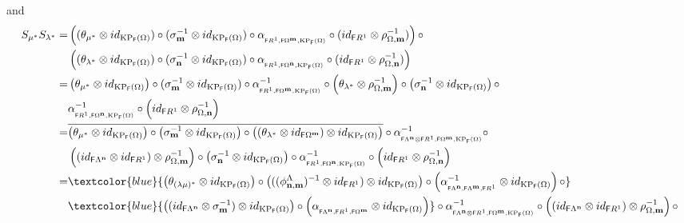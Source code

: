 \documentclass[12pt]{amsart}
\newcommand{\N}{\mathbf{n}}
\newcommand{\M}{\mathbf{m}}
\newcommand{\KP}{\operatorname{KP}}
\theoremstyle{definition}
\theoremstyle{remark}
\begin{document}
and 
{\allowdisplaybreaks
\begin{align*}
    S_{\mu^*}S_{\lambda^*}=& \left((\theta_{\mu^*}\otimes id_{\KP_\mathsf{F}(\Omega)})\circ (\sigma_\M^{-1}\otimes id_{\KP_\mathsf{F}(\Omega)})\circ \alpha_{_{\mathsf{F}R^1,\mathsf{F}\Omega^\M,\KP_\mathsf{F}(\Omega)}}\circ (id_{\mathsf{F}R^1}\otimes \rho_{\Omega,\M}^{-1})\right)\circ\\
    &\left((\theta_{\lambda^*}\otimes id_{\KP_\mathsf{F}(\Omega)})\circ (\sigma_\N^{-1}\otimes id_{\KP_\mathsf{F}(\Omega)})\circ \alpha_{_{\mathsf{F}R^1,\mathsf{F}\Omega^\N,\KP_\mathsf{F}(\Omega)}}\circ (id_{\mathsf{F}R^1}\otimes \rho_{\Omega,\N}^{-1})\right)\\
    =& \left(\theta_{\mu^*}\otimes id_{\KP_\mathsf{F}(\Omega)}\right)\circ (\sigma_\M^{-1}\otimes id_{\KP_\mathsf{F}(\Omega)})\circ \alpha_{_{\mathsf{F}R^1,\mathsf{F}\Omega^\M,\KP_\mathsf{F}(\Omega)}}^{-1}\circ \left(\theta_{\lambda^*}\otimes \rho_{\Omega,\M}^{-1}\right)\circ \left(\sigma_\N^{-1}\otimes id_{\KP_\mathsf{F}(\Omega)}\right)\circ\\
    &\alpha_{_{\mathsf{F}R^1,\mathsf{F}\Omega^\N,\KP_\mathsf{F}(\Omega)}}^{-1}\circ \left(id_{\mathsf{F}R^1}\otimes \rho_{\Omega,\N}^{-1}\right)\\
    =& \overline{\left(\theta_{\mu^*}\otimes id_{\KP_\mathsf{F}(\Omega)}\right)\circ \left(\sigma_\M^{-1}\otimes id_{\KP_\mathsf{F}(\Omega)}\right)\circ \left((\theta_{\lambda^*}\otimes id_{\mathsf{F}\Omega^\M})\otimes id_{\KP_\mathsf{F}(\Omega)}\right)}\circ \alpha_{_{\mathsf{F}\Lambda^\N\otimes \mathsf{F}R^1,\mathsf{F}\Omega^\M,\KP_\mathsf{F}(\Omega)}}^{-1}\circ\\
    &\left((id_{\mathsf{F}\Lambda^\N}\otimes id_{\mathsf{F}R^1})\otimes \rho_{\Omega,\M}^{-1}\right)\circ \left(\sigma_\N^{-1}\otimes id_{\KP_\mathsf{F}(\Omega)}\right)\circ \alpha_{_{\mathsf{F}R^1,\mathsf{F}\Omega^\N,\KP_\mathsf{F}(\Omega)}}^{-1}\circ \left(id_{\mathsf{F}R^1}\otimes \rho_{\Omega,\N}^{-1}\right)\\
    =& \textcolor{blue}{\left(\theta_{(\lambda\mu)^*}\otimes id_{\KP_\mathsf{F}(\Omega)}\right)\circ \left(((\phi_{\N,\M}^\Lambda)^{-1}\otimes id_{\mathsf{F}R^1})\otimes id_{\KP_\mathsf{F}(\Omega)}\right)\circ \left(\alpha_{_{\mathsf{F}\Lambda^\N,\mathsf{F}\Lambda^\M,\mathsf{F}R^1}}^{-1}\otimes id_{\KP_\mathsf{F}(\Omega)}\right)\circ}\\
    &\textcolor{blue}{\left((id_{\mathsf{F}\Lambda^\N}\otimes \sigma_\M^{-1})\otimes id_{\KP_\mathsf{F}(\Omega)}\right)\circ \left(\alpha_{_{\mathsf{F}\Lambda^\N,\mathsf{F}R^1,\mathsf{F}\Omega^\M}}\otimes id_{\KP_\mathsf{F}(\Omega)}\right)}\circ \alpha_{_{\mathsf{F}\Lambda^\N\otimes \mathsf{F}R^1,\mathsf{F}\Omega^\M,\KP_\mathsf{F}(\Omega)}}^{-1}\circ \left((id_{\mathsf{F}\Lambda^\N}\otimes id_{\mathsf{F}R^1})\otimes \rho_{\Omega,\M}^{-1}\right)\circ\\

\end{align*}}
\end{document}
